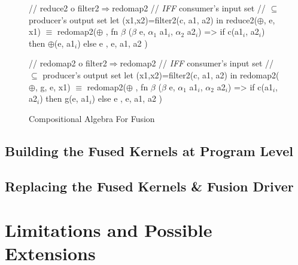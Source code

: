 \documentclass{sigplanconf}  %
\newcommand{\emp}[1]{\textcolor{DikuRed}{ #1}}
\newcommand{\emphh}[1]{\textcolor{CosGreen}{ #1}}
\newcommand{\mymath}[1]{$ #1 $}
\newcommand{\myindx}[1]{_{#1}}
\begin{document}
\begin{figure}[bt]
{\begin{minipage}{0.48\columnwidth}
\begin{colorcode}
//\emp{reduce2 o filter2\mymath{\Rightarrow}redomap2}
//\emp{{\em{}IFF} consumer's input set}
//\emp{  \mymath{\subseteq} producer's output set}
let (x1,x2)=filter2(c, a1, a2)
in  reduce2(\mymath{\oplus}, e, x1)
    \emphh{\mymath{\equiv}}
redomap2(\mymath{\oplus}
, fn \mymath{\beta} (\mymath{\beta} e, \mymath{\alpha\myindx{1}} a1\mymath{\myindx{i}}, \mymath{\alpha\myindx{2}} a2\mymath{\myindx{i}})
   => if c(a1\mymath{\myindx{i}}, a2\mymath{\myindx{i}})
      then \mymath{\oplus}(e, a1\mymath{\myindx{i}}) else e
, e, a1, a2 )




//\emp{redomap2 o filter2\mymath{\Rightarrow}redomap2}
//\emp{{\em{}IFF} consumer's input set}
//\emp{  \mymath{\subseteq} producer's output set}
let (x1,x2)=filter2(c, a1, a2)
in  redomap2(\mymath{\oplus}, g, e, x1)
    \emphh{\mymath{\equiv}}
redomap2(\mymath{\oplus}
, fn \mymath{\beta} (\mymath{\beta} e, \mymath{\alpha\myindx{1}} a1\mymath{\myindx{i}}, \mymath{\alpha\myindx{2}} a2\mymath{\myindx{i}})
   => if c(a1\mymath{\myindx{i}}, a2\mymath{\myindx{i}})
      then g(e, a1\mymath{\myindx{i}}) else e
, e, a1, a2 )
\end{colorcode}
\end{minipage}
} 
\caption{Compositional Algebra For Fusion}
\label{fig:CompatFuse}
\end{figure}



\subsection{Building the Fused Kernels at Program Level}
\label{sec:bwdPass}

\subsection{Replacing the Fused Kernels \& Fusion Driver}
\label{sec:fwdPass}


\section{Limitations and Possible Extensions}
\label{sec:Discuss}
\end{document}
